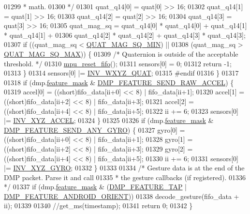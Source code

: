 \begin{DoxyCode}
01299 \textcolor{comment}{         * math.}
01300 \textcolor{comment}{         */}
01301         quat\_q14[0] = quat[0] >> 16;
01302         quat\_q14[1] = quat[1] >> 16;
01303         quat\_q14[2] = quat[2] >> 16;
01304         quat\_q14[3] = quat[3] >> 16;
01305         quat\_mag\_sq = quat\_q14[0] * quat\_q14[0] + quat\_q14[1] * quat\_q14[1] +
01306             quat\_q14[2] * quat\_q14[2] + quat\_q14[3] * quat\_q14[3];
01307         \textcolor{keywordflow}{if} ((quat\_mag\_sq < \hyperlink{group___d_r_i_v_e_r_s_gae76871da254b93d8b944ec65792db252}{QUAT\_MAG\_SQ\_MIN}) ||
01308             (quat\_mag\_sq > \hyperlink{group___d_r_i_v_e_r_s_ga3036f612f259f4e13c631a31fb0e7176}{QUAT\_MAG\_SQ\_MAX})) \{
01309             \textcolor{comment}{/* Quaternion is outside of the acceptable threshold. */}
01310             \hyperlink{group___d_r_i_v_e_r_s_gaf23e9f57c0059be6ec57862f0584de10}{mpu\_reset\_fifo}();
01311             sensors[0] = 0;
01312             \textcolor{keywordflow}{return} -1;
01313         \}
01314         sensors[0] |= \hyperlink{group___d_r_i_v_e_r_s_ga3d79cffe845a796a27d03432a1f2ade0}{INV\_WXYZ\_QUAT};
01315 \textcolor{preprocessor}{#endif}
01316     \}
01317 
01318     \textcolor{keywordflow}{if} (dmp.\hyperlink{structdmp__s_ac1c048fa56b613b3223d2e66ac2c050f}{feature\_mask} & \hyperlink{group___d_r_i_v_e_r_s_ga9eeb257febe4a305df7ad4cf31dc2755}{DMP\_FEATURE\_SEND\_RAW\_ACCEL}) \{
01319         accel[0] = ((short)fifo\_data[ii+0] << 8) | fifo\_data[ii+1];
01320         accel[1] = ((short)fifo\_data[ii+2] << 8) | fifo\_data[ii+3];
01321         accel[2] = ((short)fifo\_data[ii+4] << 8) | fifo\_data[ii+5];
01322         ii += 6;
01323         sensors[0] |= \hyperlink{group___d_r_i_v_e_r_s_gaa03f025a17ed491e70b88274e89c75c5}{INV\_XYZ\_ACCEL};
01324     \}
01325 
01326     \textcolor{keywordflow}{if} (dmp.\hyperlink{structdmp__s_ac1c048fa56b613b3223d2e66ac2c050f}{feature\_mask} & \hyperlink{group___d_r_i_v_e_r_s_gadda8f4118bd084cfb4fcda3571585c56}{DMP\_FEATURE\_SEND\_ANY\_GYRO}) \{
01327         gyro[0] = ((short)fifo\_data[ii+0] << 8) | fifo\_data[ii+1];
01328         gyro[1] = ((short)fifo\_data[ii+2] << 8) | fifo\_data[ii+3];
01329         gyro[2] = ((short)fifo\_data[ii+4] << 8) | fifo\_data[ii+5];
01330         ii += 6;
01331         sensors[0] |= \hyperlink{group___d_r_i_v_e_r_s_ga3fdc30f9c0a26c2c4e2bb88921f91629}{INV\_XYZ\_GYRO};
01332     \}
01333 
01334     \textcolor{comment}{/* Gesture data is at the end of the DMP packet. Parse it and call}
01335 \textcolor{comment}{     * the gesture callbacks (if registered).}
01336 \textcolor{comment}{     */}
01337     \textcolor{keywordflow}{if} (dmp.\hyperlink{structdmp__s_ac1c048fa56b613b3223d2e66ac2c050f}{feature\_mask} & (\hyperlink{group___d_r_i_v_e_r_s_ga87fac39cf95e2c56afdf507a986fa00b}{DMP\_FEATURE\_TAP} | 
      \hyperlink{group___d_r_i_v_e_r_s_gaf2b250fc928390d562f7bd80300ce419}{DMP\_FEATURE\_ANDROID\_ORIENT}))
01338         decode\_gesture(fifo\_data + ii);
01339 
01340     \textcolor{comment}{//get\_ms(timestamp);}
01341     \textcolor{keywordflow}{return} 0;
01342 \}
\end{DoxyCode}
